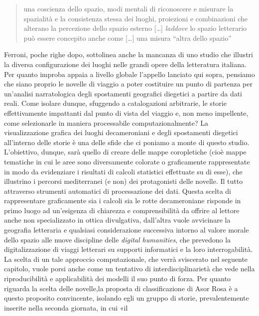 \begin{quote}
una coscienza dello spazio, modi mentali di riconoscere e misurare la
spazialità e la consistenza stessa dei luoghi, proiezioni e combinazioni
che alterano la percezione dello spazio esterno {[}\ldots{}{]}
\emph{laddove} lo spazio letterario può essere concepito anche come
{[}\ldots{}{]} una misura ``altra dello
spazio''\autocite[p.~90]{ferroni2012}
\end{quote}

Ferroni, poche righe dopo, sottolinea anche la mancanza di uno studio
che illustri la diversa configurazione dei luoghi nelle grandi opere
della letteratura italiana. Per quanto improba appaia a livello globale
l'appello lanciato qui sopra, pensiamo che siano proprio le novelle di
viaggio a poter costituire un punto di partenza per un'analisi
narratologica degli spostamenti geografici diegetici a partire da dati
reali. Come isolare dunque, sfuggendo a catalogazioni arbitrarie, le
storie effettivamente impattanti dal punto di vista del viaggio e, non
meno impellente, come selezionarle in maniera processabile
computazionalmente? La visualizzazione grafica dei luoghi decameroniani
e degli spostamenti diegetici all'interno delle storie è una delle sfide
che ci poniamo a monte di questo studio. L'obiettivo, dunque, sarà
quello di creare delle mappe coropletiche (cioè mappe tematiche in cui
le aree sono diversamente colorate o graficamente rappresentate in modo
da evidenziare i risultati di calcoli statistici effettuate su di esse),
che illustrino i percorsi mediterranei (e non) dei protagonisti delle
novelle. Il tutto attraverso strumenti automatici di processazione dei
dati. Questa scelta di rappresentare graficamente sia i calcoli sia le
rotte decameroniane risponde in primo luogo ad un'esigenza di chiarezza
e comprensibilità da offrire al lettore anche non specializzato in
ottica divulgativa, dall'altra vuole avvicinare la geografia letteraria
e qualsiasi considerazione successiva intorno al valore morale dello
spazio alle nuove discipline delle \emph{digital humanities}, che
prevedono la digitalizzazione di viaggi letterari su supporti
informatici e la loro interrogabilità. La scelta di un tale approccio
computazionale, che verrà sviscerato nel seguente capitolo, vuole porsi
anche come un tentativo di interdisciplinarietà che vede nella
riproducibilità e applicabilità dei modelli il suo punto di forza. Per
quanto riguarda la scelta delle novelle,la proposta di classificazione
di Asor Rosa è a questo proposito convincente, isolando egli un gruppo
di storie, prevalentemente inserite nella seconda giornata, in cui «il
